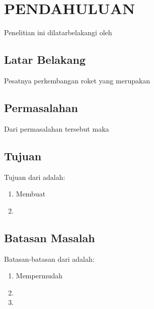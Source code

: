 \chapter{PENDAHULUAN}
\label{chap:pendahuluan}


Penelitian ini dilatarbelakangi oleh \lipsum[1][1-5]

\section{Latar Belakang}
\label{sec:latarbelakang}

Pesatnya perkembangan roket yang merupakan \lipsum[1]

\lipsum[2]

\section{Permasalahan}
\label{sec:permasalahan}

Dari permasalahan tersebut maka \lipsum[1][1-6]

\section{Tujuan}
\label{sec:Tujuan}

Tujuan dari \lipsum[1][1-3] adalah:

\begin{enumerate}[nolistsep]

  \item Membuat \lipsum[2][1-3]

  \item \lipsum[3][1-3]

\end{enumerate}

\section{Batasan Masalah}
\label{sec:batasanmasalah}

Batasan-batasan dari \lipsum[1][1-3] adalah:

\begin{enumerate}[nolistsep]

  \item Mempermudah \lipsum[2][1-3]

  \item \lipsum[3][1-5]

  \item \lipsum[4][1-5]

\end{enumerate}

